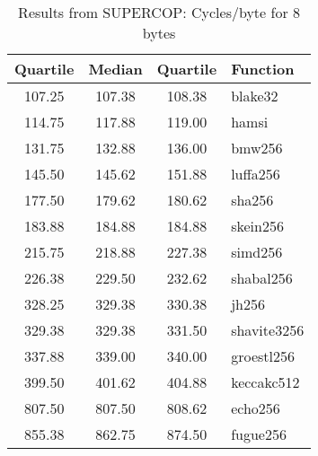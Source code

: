 \begin{table}
  \centering
  \begin{tabular}{ | c | c | c | l | }
    \hline
    \textbf{Quartile} & \textbf{Median} & \textbf{Quartile} & \textbf{Function} \\ \hline
    107.25 & 107.38 & 108.38 & blake32 \\ \hline
    114.75 & 117.88 & 119.00 & hamsi \\ \hline
    131.75 & 132.88 & 136.00 & bmw256 \\ \hline
    145.50 & 145.62 & 151.88 & luffa256 \\ \hline
    177.50 & 179.62 & 180.62 & sha256 \\ \hline
    183.88 & 184.88 & 184.88 & skein256 \\ \hline
    215.75 & 218.88 & 227.38 & simd256 \\ \hline
    226.38 & 229.50 & 232.62 & shabal256 \\ \hline
    328.25 & 329.38 & 330.38 & jh256 \\ \hline
    329.38 & 329.38 & 331.50 & shavite3256 \\ \hline
    337.88 & 339.00 & 340.00 & groestl256 \\ \hline
    399.50 & 401.62 & 404.88 & keccakc512 \\ \hline
    807.50 & 807.50 & 808.62 & echo256 \\ \hline
    855.38 & 862.75 & 874.50 & fugue256 \\ \hline
  \end{tabular}
  \caption{Results from SUPERCOP: Cycles/byte for 8 bytes}
  \label{tbl:supercop:8}
\end{table}
